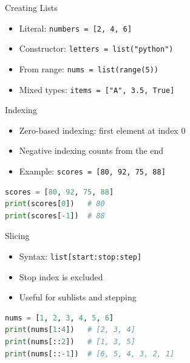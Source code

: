 \documentclass{beamer}
\begin{document}
\begin{frame}[fragile]{Creating Lists}
  \begin{itemize}[<+->]
    \item Literal: \texttt{numbers = [2, 4, 6]}
    \item Constructor: \texttt{letters = list("python")}
    \item From range: \texttt{nums = list(range(5))}
    \item Mixed types: \texttt{items = ["A", 3.5, True]}
  \end{itemize}
\end{frame}

\begin{frame}[fragile]{Indexing}
  \begin{itemize}[<+->]
    \item Zero-based indexing: first element at index 0
    \item Negative indexing counts from the end
    \item Example: \texttt{scores = [80, 92, 75, 88]}
  \end{itemize}
  \vspace{0.4em}
  \begin{lstlisting}[language=Python]
scores = [80, 92, 75, 88]
print(scores[0])   # 80
print(scores[-1])  # 88
  \end{lstlisting}
\end{frame}

\begin{frame}[fragile]{Slicing}
  \begin{itemize}[<+->]
    \item Syntax: \texttt{list[start:stop:step]}
    \item Stop index is excluded
    \item Useful for sublists and stepping
  \end{itemize}
  \vspace{0.4em}
  \begin{lstlisting}[language=Python]
nums = [1, 2, 3, 4, 5, 6]
print(nums[1:4])   # [2, 3, 4]
print(nums[::2])   # [1, 3, 5]
print(nums[::-1])  # [6, 5, 4, 3, 2, 1]
  \end{lstlisting}
\end{frame}
\end{document}

